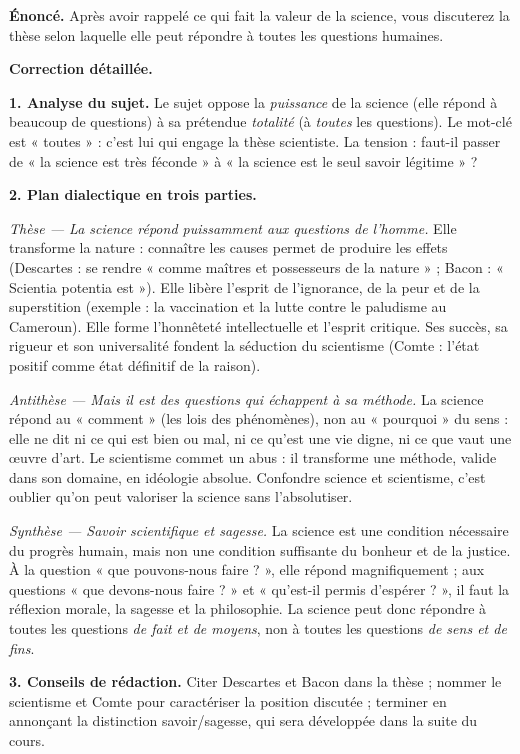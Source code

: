 \documentclass[11pt]{article}
\begin{document}
\begin{exoresolu}
\textbf{Énoncé.} Après avoir rappelé ce qui fait la valeur de la science, vous discuterez la thèse selon laquelle elle peut répondre à toutes les questions humaines.

\tcblower
\textbf{Correction détaillée.}

\textbf{1. Analyse du sujet.} Le sujet oppose la \emph{puissance} de la science (elle répond à beaucoup de questions) à sa prétendue \emph{totalité} (à \emph{toutes} les questions). Le mot-clé est « toutes » : c'est lui qui engage la thèse scientiste. La tension : faut-il passer de « la science est très féconde » à « la science est le seul savoir légitime » ?

\textbf{2. Plan dialectique en trois parties.}

\emph{Thèse — La science répond puissamment aux questions de l'homme.} Elle transforme la nature : connaître les causes permet de produire les effets (Descartes : se rendre « comme maîtres et possesseurs de la nature » ; Bacon : « Scientia potentia est »). Elle libère l'esprit de l'ignorance, de la peur et de la superstition (exemple : la vaccination et la lutte contre le paludisme au Cameroun). Elle forme l'honnêteté intellectuelle et l'esprit critique. Ses succès, sa rigueur et son universalité fondent la séduction du scientisme (Comte : l'état positif comme état définitif de la raison).

\emph{Antithèse — Mais il est des questions qui échappent à sa méthode.} La science répond au « comment » (les lois des phénomènes), non au « pourquoi » du sens : elle ne dit ni ce qui est bien ou mal, ni ce qu'est une vie digne, ni ce que vaut une œuvre d'art. Le scientisme commet un abus : il transforme une méthode, valide dans son domaine, en idéologie absolue. Confondre science et scientisme, c'est oublier qu'on peut valoriser la science sans l'absolutiser.

\emph{Synthèse — Savoir scientifique et sagesse.} La science est une condition nécessaire du progrès humain, mais non une condition suffisante du bonheur et de la justice. À la question « que pouvons-nous faire ? », elle répond magnifiquement ; aux questions « que devons-nous faire ? » et « qu'est-il permis d'espérer ? », il faut la réflexion morale, la sagesse et la philosophie. La science peut donc répondre à toutes les questions \emph{de fait et de moyens}, non à toutes les questions \emph{de sens et de fins}.

\textbf{3. Conseils de rédaction.} Citer Descartes et Bacon dans la thèse ; nommer le scientisme et Comte pour caractériser la position discutée ; terminer en annonçant la distinction savoir/sagesse, qui sera développée dans la suite du cours.
\end{exoresolu}
\end{document}

